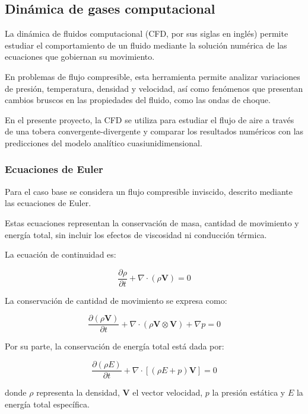 \documentclass[12pt,letterpaper]{article}
\numberwithin{equation}{section}
\begin{document}
\subsection{Dinámica de gases computacional}

La dinámica de fluidos computacional (CFD,
por sus siglas en inglés) permite estudiar
el comportamiento de un fluido mediante
la solución numérica de las ecuaciones
que gobiernan su movimiento.

En problemas de flujo compresible, esta
herramienta permite analizar variaciones
de presión, temperatura, densidad y
velocidad, así como fenómenos que
presentan cambios bruscos en las
propiedades del fluido, como las
ondas de choque.

En el presente proyecto, la CFD se
utiliza para estudiar el flujo de aire
a través de una tobera convergente-divergente
y comparar los resultados numéricos
con las predicciones del modelo
analítico cuasiunidimensional.


\subsubsection{Ecuaciones de Euler}

Para el caso base se considera un
flujo compresible inviscido, descrito
mediante las ecuaciones de Euler.

Estas ecuaciones representan la
conservación de masa, cantidad de
movimiento y energía total, sin
incluir los efectos de viscosidad
ni conducción térmica.

La ecuación de continuidad es:

\begin{equation}
\frac{\partial \rho}{\partial t}
+\nabla\cdot(\rho\mathbf{V})=0
\end{equation}

La conservación de cantidad de
movimiento se expresa como:

\begin{equation}
\frac{\partial(\rho\mathbf{V})}{\partial t}
+\nabla\cdot
(\rho\mathbf{V}\otimes\mathbf{V})
+\nabla p=0
\end{equation}

Por su parte, la conservación de
energía total está dada por:

\begin{equation}
\frac{\partial(\rho E)}{\partial t}
+\nabla\cdot
\left[(\rho E+p)\mathbf{V}\right]=0
\end{equation}

donde $\rho$ representa la densidad,
$\mathbf{V}$ el vector velocidad,
$p$ la presión estática y $E$
la energía total específica.
\end{document}
